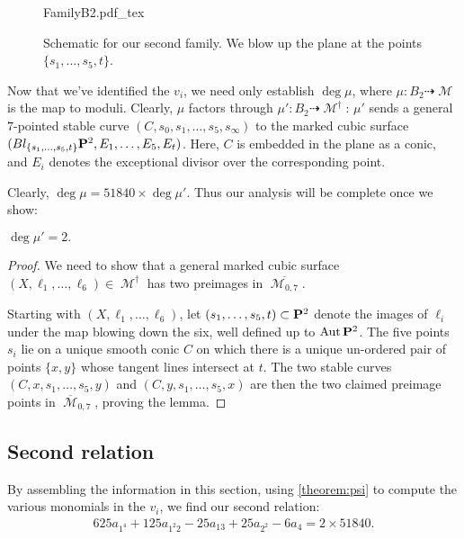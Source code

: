 \documentclass[12pt,reqno]{amsart}
\newcommand{\incfig}[1]{%
    \def\svgwidth{\columnwidth}
    {#1.pdf_tex}
}
\DeclareMathOperator{\M}{\mathcal{M}}
\numberwithin{equation}{section}
\renewcommand {\o}[1]{\overline{#1}}
\begin{document}
\begin{figure}[!]
    \centering
    \incfig{FamilyB2}
    \caption{Schematic for our second family. We blow up the plane at
      the points $\{s_{1}, \dots, s_{5}, t\}$.}
    \label{fig:FamilyB2}
\end{figure}


Now that we've identified the $v_{i}$, we need only establish
$\deg \mu$, where $\mu: B_{2} \dashrightarrow \M$ is the map to
moduli.  Clearly, $\mu$ factors through
$\mu':B_{2} \dashrightarrow \M^{\dagger}$: $\mu'$ sends a general
$7$-pointed stable curve $(C,s_0,s_1, \dots, s_5, s_{\infty})$ to the
marked cubic surface
$(Bl_{\{s_1, \dots, s_{5}, t\}}\P^{2}, E_1, \dots, E_5, E_t)$. Here,
$C$ is embedded in the plane as a conic, and $E_i$ denotes the
exceptional divisor over the corresponding point.

Clearly, $\deg \mu = 51840 \times \deg \mu'$.  Thus our analysis will
be complete once we show:

\begin{lemma}
  \label{lemma:muprime2} $\deg \mu' = 2.$
\end{lemma}

\begin{proof}
  We need to show that a general marked cubic surface
  $(X, \ell_{1}, \dots, \ell_{6}) \in \M^{\dagger}$ has two preimages
  in $\o{\M_{0,7}}$.
  
  
  Starting with $(X, \ell_{1}, \dots, \ell_{6})$, let
  $(s_1, \dots, s_5, t) \subset \P^{2}$ denote the images of
  $\ell_{i}$ under the map blowing down the six, well defined up to
  $\Aut \P^{2}$.  The five points $s_{i}$ lie on a unique smooth conic
  $C$ on which there is a unique un-ordered pair of points $\{x,y\}$
  whose tangent lines intersect at $t$.  The two stable curves
  $(C,x,s_1, \dots, s_5, y)$ and $(C,y,s_1, \dots, s_5, x)$ are then
  the two claimed preimage points in $\o{\M}_{0,7}$, proving the
  lemma.
\end{proof}


\subsection{Second relation}
\label{sec:secondrelation}

By assembling the information in this section, using
\autoref{theorem:psi} to compute the various monomials in the $v_{i}$,
we find our second relation:
\begin{align}
  \label{eq:relation2}
  625 a_{1^{4}} + 125 a_{1^{2}2} - 25a_{13} + 25a_{2^2} - 6 a_{4} = 2 \times 51840.
\end{align}
\end{document}
